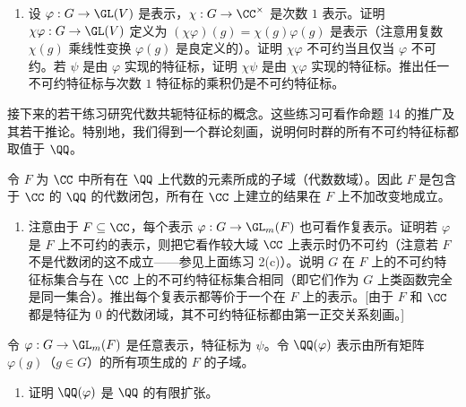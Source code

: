 \begin{enumerate}[label=\arabic*.]
\begin{enumerate}[label=(\alph*)]
    \item 若 $\psi(g)=\psi(1)$，则 $g\in\ker\varphi$；
    \item 若 $|\psi(g)|=\psi(1)$ 且 $\varphi$ 忠实，则 $g\in Z(G)$（这里 $|\psi(g)|$ 是复绝对值）。[用命题 14 证明的方法。]
  \end{enumerate}
  \item 设 $\varphi:G\to\GL(V)$ 是表示，$\chi:G\to\CC^\times$ 是次数 $1$ 表示。证明 $\chi\varphi:G\to\GL(V)$ 定义为 $(\chi\varphi)(g)=\chi(g)\varphi(g)$ 是表示（注意用复数 $\chi(g)$ 乘线性变换 $\varphi(g)$ 是良定义的）。证明 $\chi\varphi$ 不可约当且仅当 $\varphi$ 不可约。若 $\psi$ 是由 $\varphi$ 实现的特征标，证明 $\chi\psi$ 是由 $\chi\varphi$ 实现的特征标。推出任一不可约特征标与次数 $1$ 特征标的乘积仍是不可约特征标。
\end{enumerate}

接下来的若干练习研究代数共轭特征标的概念。这些练习可看作命题 14 的推广及其若干推论。特别地，我们得到一个群论刻画，说明何时群的所有不可约特征标都取值于 $\QQ$。

令 $F$ 为 $\CC$ 中所有在 $\QQ$ 上代数的元素所成的子域（代数数域）。因此 $F$ 是包含于 $\CC$ 的 $\QQ$ 的代数闭包，所有在 $\CC$ 上建立的结果在 $F$ 上不加改变地成立。
\begin{enumerate}[label=\arabic*.,resume]
  \item 注意由于 $F\subseteq\CC$，每个表示 $\varphi:G\to\GL_m(F)$ 也可看作复表示。证明若 $\varphi$ 是 $F$ 上不可约的表示，则把它看作较大域 $\CC$ 上表示时仍不可约（注意若 $F$ 不是代数闭的这不成立——参见上面练习 2(c)）。说明 $G$ 在 $F$ 上的不可约特征标集合与在 $\CC$ 上的不可约特征标集合相同（即它们作为 $G$ 上类函数完全是同一集合）。推出每个复表示都等价于一个在 $F$ 上的表示。[由于 $F$ 和 $\CC$ 都是特征为 $0$ 的代数闭域，其不可约特征标都由第一正交关系刻画。]
\end{enumerate}

令 $\varphi:G\to\GL_m(F)$ 是任意表示，特征标为 $\psi$。令 $\QQ(\varphi)$ 表示由所有矩阵 $\varphi(g)$（$g\in G$）的所有项生成的 $F$ 的子域。
\begin{enumerate}[label=\arabic*.,resume]
  \item 证明 $\QQ(\varphi)$ 是 $\QQ$ 的有限扩张。
\end{enumerate}

